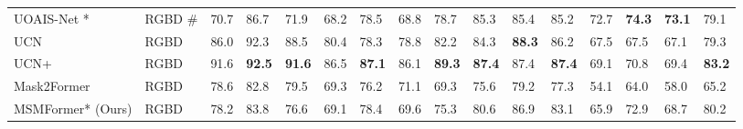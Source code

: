 \documentclass[letterpaper, 10 pt, conference]{ieeeconf}
\begin{document}
\begin{table*}
{\begin{tabular}{|l|l|lllllll|lllllll|}
UOAIS-Net \cite{back2022unseen}*   & RGBD \#                  & 70.7                           & 86.7                  & \multicolumn{1}{l|}{71.9}          & 68.2                           & 78.5                  & \multicolumn{1}{l|}{68.8}          & 78.7                  & 85.3                  & 85.4                           & \multicolumn{1}{l|}{85.2} & 72.7                  & \textbf{74.3}                  & \multicolumn{1}{l|}{\textbf{73.1}} & 79.1                          
                           \\

UCN \cite{xiang2020learning}          & RGBD                   & 86.0                  & 92.3                  & \multicolumn{1}{l|}{88.5}          & 80.4                  & 78.3                  & \multicolumn{1}{l|}{78.8}          & 82.2          & 84.3                  & \textbf{88.3}         & \multicolumn{1}{l|}{86.2}          & 67.5                  & 67.5                  & \multicolumn{1}{l|}{67.1}          & 79.3          \\

UCN+ \cite{xiang2020learning}         & RGBD                   & 91.6                  & \textbf{92.5}         & \multicolumn{1}{l|}{\textbf{91.6}} & 86.5                  & \textbf{87.1}         & \multicolumn{1}{l|}{86.1}          & \textbf{89.3} & \textbf{87.4}         & 87.4                  & \multicolumn{1}{l|}{\textbf{87.4}} & 69.1                  & 70.8                  & \multicolumn{1}{l|}{69.4}          & \textbf{83.2} \\





Mask2Former \cite{cheng2022masked} & RGBD                   & 78.6                  & 82.8                  & \multicolumn{1}{l|}{79.5}          & 69.3                  & 76.2                  & \multicolumn{1}{l|}{71.1}          & 69.3          & 75.6                  & 79.2                  & \multicolumn{1}{l|}{77.3}          & 54.1                  & 64.0                  & \multicolumn{1}{l|}{58.0}          & 65.2          \\ 

MSMFormer* (Ours)                                  & RGBD                   & 78.2                  & 83.8                           & \multicolumn{1}{l|}{76.6} & 69.1                  & 78.4                           & \multicolumn{1}{l|}{69.6} & 75.3                           & 80.6                           & 86.9                  & \multicolumn{1}{l|}{83.1}          & 65.9                           & 72.9                           & \multicolumn{1}{l|}{68.7}          & 80.2                  \\



\end{tabular}}
\end{table*}
\end{document}
